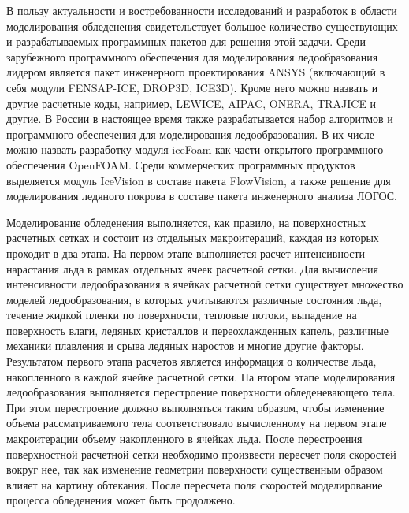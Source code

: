 \documentclass[a4paper,14pt]{extarticle}                     %
\theoremstyle{plain}                                         %
\begin{document}
В пользу актуальности и востребованности исследований и разработок в области моделирования обледенения свидетельствует большое количество существующих и разрабатываемых программных пакетов для решения этой задачи.
Среди зарубежного программного обеспечения для моделирования ледообразования лидером является пакет инженерного проектирования ANSYS (включающий в себя модули FENSAP-ICE, DROP3D, ICE3D).
Кроме него можно назвать и другие расчетные коды, например, LEWICE, AIPAC, ONERA, TRAJICE и другие.
В России в настоящее время также разрабатывается набор алгоритмов и программного обеспечения для моделирования ледообразования.
В их числе можно назвать разработку модуля iceFoam как части открытого программного обеспечения OpenFOAM.
Среди коммерческих программных продуктов выделяется модуль IceVision в составе пакета FlowVision, а также решение для моделирования ледяного покрова в составе пакета инженерного анализа ЛОГОС.

Моделирование обледенения выполняется, как правило, на поверхностных расчетных сетках и состоит из отдельных макроитераций, каждая из которых проходит в два этапа.
На первом этапе выполняется расчет интенсивности нарастания льда в рамках отдельных ячеек расчетной сетки.
Для вычисления интенсивности ледообразования в ячейках расчетной сетки существует множество моделей ледообразования, в которых учитываются различные состояния льда, течение жидкой пленки по поверхности, тепловые потоки, выпадение на поверхность влаги, ледяных кристаллов и переохлажденных капель, различные механики плавления и срыва ледяных наростов и многие другие факторы.
Результатом первого этапа расчетов является информация о количестве льда, накопленного в каждой ячейке расчетной сетки.
На втором этапе моделирования ледообразования выполняется перестроение поверхности обледеневающего тела.
При этом перестроение должно выполняться таким образом, чтобы изменение объема рассматриваемого тела соответствовало вычисленному на первом этапе макроитерации объему накопленного в ячейках льда.
После перестроения поверхностной расчетной сетки необходимо произвести пересчет поля скоростей вокруг нее, так как изменение геометрии поверхности существенным образом влияет на картину обтекания.
После пересчета поля скоростей моделирование процесса обледенения может быть продолжено.
\end{document}

